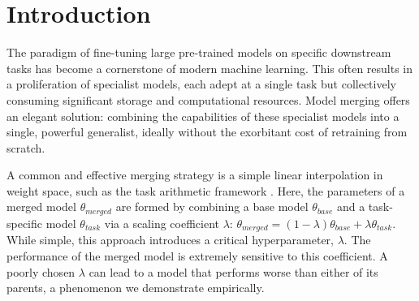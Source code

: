 \documentclass{article}
\theoremstyle{plain}
\theoremstyle{definition}
\theoremstyle{remark}
\begin{document}
\begin{abstract}
Model merging aims to combine multiple fine-tuned models into a single multitask model, but its success often hinges on finding the right coefficients to balance the models' parameters. The standard approach---a costly grid search over coefficients evaluated on a validation set---undermines the computational promise of merging. We introduce Activation Overlap Search (AOS), a data-driven, training-free method to estimate these coefficients. AOS operates on the principle that the optimal merge coefficient is the one that maximally preserves the functional behavior of a base model, which we measure by comparing internal activation manifolds. Through a massive empirical study spanning over 2,160 unique configurations across three datasets, four similarity metrics, and numerous hyperparameters, we demonstrate that AOS with Centered Kernel Alignment (CKA) is a near-perfect proxy for validation accuracy. Our method exactly identifies the oracle peak accuracy of 58.43\%, a feat unachievable by naive Weight Averaging, which catastrophically fails at 34.58\%. Furthermore, AOS is remarkably data-efficient, nearing oracle performance with as few as 16 data samples. Our work provides overwhelming empirical evidence that functional similarity in activation space is a powerful and practical tool for navigating the model merging landscape.
\end{abstract}

\section{Introduction}

The paradigm of fine-tuning large pre-trained models on specific downstream tasks has become a cornerstone of modern machine learning. This often results in a proliferation of specialist models, each adept at a single task but collectively consuming significant storage and computational resources. Model merging offers an elegant solution: combining the capabilities of these specialist models into a single, powerful generalist, ideally without the exorbitant cost of retraining from scratch.

A common and effective merging strategy is a simple linear interpolation in weight space, such as the task arithmetic framework \citep{ilharco2022editing}. Here, the parameters of a merged model $\theta_{merged}$ are formed by combining a base model $\theta_{base}$ and a task-specific model $\theta_{task}$ via a scaling coefficient $\lambda$: $\theta_{merged} = (1-\lambda)\theta_{base} + \lambda\theta_{task}$. While simple, this approach introduces a critical hyperparameter, $\lambda$. The performance of the merged model is extremely sensitive to this coefficient. A poorly chosen $\lambda$ can lead to a model that performs worse than either of its parents, a phenomenon we demonstrate empirically.
\end{document}
